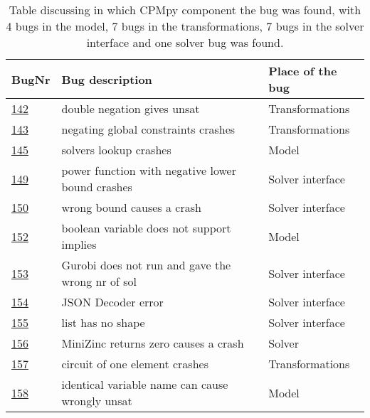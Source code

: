 \begin{table}[]
	\centering
	\caption{Table discussing in which CPMpy component the bug was found, with 4 bugs in the model, 7 bugs in the transformations, 7 bugs in the solver interface and one solver bug was found.}
	\label{tab:bug:placeComponent}
	\begin{tabular}{lll}
		\hline
		BugNr & Bug description                                         & Place of the bug \\ \toprule
		\href{https://github.com/CPMpy/cpmpy/issues/142}{142} & double negation gives unsat                            & Transformations \\
		\href{https://github.com/CPMpy/cpmpy/issues/143}{143} & negating global constraints crashes                 & Transformations \\
		\href{https://github.com/CPMpy/cpmpy/issues/145}{145} & solvers lookup crashes                            & Model            \\
		\href{https://github.com/CPMpy/cpmpy/issues/149}{149} & power function with negative lower bound crashes  & Solver interface \\
		\href{https://github.com/CPMpy/cpmpy/issues/150}{150} & wrong bound causes a crash                        & Solver interface \\
		\href{https://github.com/CPMpy/cpmpy/issues/152}{152} & boolean variable does not support implies         & Model            \\
		\href{https://github.com/CPMpy/cpmpy/issues/153}{153} & Gurobi does not run and gave the wrong nr of sol  & Solver interface \\
		\href{https://github.com/CPMpy/cpmpy/issues/154}{154} & JSON Decoder error                                & Solver interface \\
		\href{https://github.com/CPMpy/cpmpy/issues/155}{155} & list has no shape                                 & Solver interface \\
		\href{https://github.com/CPMpy/cpmpy/issues/156}{156} & MiniZinc returns zero causes a crash              & Solver           \\
		\href{https://github.com/CPMpy/cpmpy/issues/157}{157} & circuit of one element crashes                    & Transformations  \\
		\href{https://github.com/CPMpy/cpmpy/issues/158}{158} & identical variable name can cause wrongly unsat   & Model            \\

\end{tabular}
\end{table}
